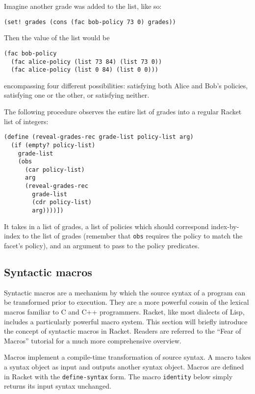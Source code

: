 \documentclass{article}
\begin{document}
Imagine another grade was added to the list, like so:

\begin{lstlisting}
(set! grades (cons (fac bob-policy 73 0) grades))
\end{lstlisting}

Then the value of the list would be

\begin{lstlisting}
(fac bob-policy
  (fac alice-policy (list 73 84) (list 73 0))
  (fac alice-policy (list 0 84) (list 0 0)))
\end{lstlisting}

encompassing four different possibilities: satisfying both Alice and Bob's policies, satisfying one or the other, or satisfying neither.

The following procedure observes the entire list of grades into a regular Racket list of integers:

\begin{lstlisting}
(define (reveal-grades-rec grade-list policy-list arg)
  (if (empty? policy-list)
    grade-list
    (obs
      (car policy-list)
      arg
      (reveal-grades-rec
        grade-list
        (cdr policy-list)
        arg))))])
\end{lstlisting}

It takes in a list of grades, a list of policies which should correspond index-by-index to the list of grades (remember that \texttt{obs} requires the policy to match the facet's policy), and an argument to pass to the policy predicates.

\subsection{Syntactic macros}
Syntactic macros are a mechanism by which the source syntax of a program can be transformed prior to execution. They are a more powerful cousin of the lexical macros familiar to C and C++ programmers. Racket, like most dialects of Lisp, includes a particularly powerful macro system. This section will briefly introduce the concept of syntactic macros in Racket. Readers are referred to the ``Fear of Macros'' tutorial \cite{fear-of-macros} for a much more comprehensive overview.

Macros implement a compile-time transformation of source syntax. A macro takes a syntax object as input and outputs another syntax object. Macros are defined in Racket with the \texttt{define-syntax} form. The macro \texttt{identity} below simply returns its input syntax unchanged.
\end{document}
